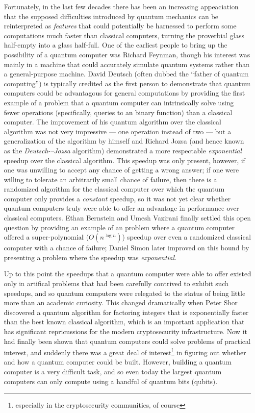 \documentclass{amsbook}
\theoremstyle{plain}
\theoremstyle{definition}
\theoremstyle{remark}
\begin{document}
Fortunately, in the last few decades there has been an increasing appeaciation that the supposed difficulties introduced by quantum mechanics can be reinterpreted as \emph{features} that could potentially be harnessed to perform some computations much faster than classical computers, turning the proverbial glass half-empty into a glass half-full.  One of the earliest people to bring up the possibility of a quantum computer was Richard Feynman, though his interest was mainly in a machine that could accurately simulate quantum systems rather than a general-purpose machine\cite{springerlink:10.1007/BF02650179}.  David Deutsch (often dubbed the ``father of quantum computing'') is typically credited as the first person to demonstrate that quantum computers could be advantagous for general computations by providing the first example of a problem that a quantum computer can intrinsically solve using fewer operations (specifically, queries to an binary function) than a classical computer\cite{Deutsch08071985}.  The improvement of his quantum algorithm over the classical algorithm was not very impressive --- one operation instead of two --- but a generalization of the algorithm by himself and Richard Jozsa (and hence known as the \emph{Deutsch-–Jozsa} algorithm) demonstrated a more respectable \emph{exponential} speedup over the classical algorithm\cite{Deutsch1992}.  This speedup was only present, however, if one was unwilling to accept any chance of getting a wrong answer;  if one were willing to tolerate an arbitrarily small chance of failure, then there is a randomized algorithm for the classical computer over which the quantum computer only provides a \emph{constant} speedup, so it was not yet clear whether quantum computers truly were able to offer an advantage in performance over classical computers.  Ethan Bernstein and Umesh Vazirani finally settled this open question by providing an example of an problem where a quantum computer offered a super-polynomial ($O(n^{\log n})$) speedup over even a randomized classical computer with a chance of failure\cite{Bernstein:1993:QCT:167088.167097};  Daniel Simon later improved on this bound by presenting a problem where the speedup was \emph{exponential}\cite{10.1109/SFCS.1994.365701}.

Up to this point the speedups that a quantum computer were able to offer existed only in artifical problems that had been carefully contrived to exhibit such speedups, and so quantum computers were relegated to the status of being little more than an academic curiosity.  This changed dramatically when Peter Shor discovered a quantum algorithm for factoring integers that is exponentially faster than the best known classical algorithm, which is an important application that has significant repricussions for the modern cryptosecurity infrastructure.  Now it had finally been shown that quantum computers could solve problems of practical interest, and suddenly there was a great deal of interest\footnote{especially in the cryptosecurity communities, of course} in figuring out whether and how a quantum computer could be built.  However, building a quantum computer is a very difficult task, and so even today the largest quantum computers can only compute using a handful of quantum bits (qubits).
\end{document}
